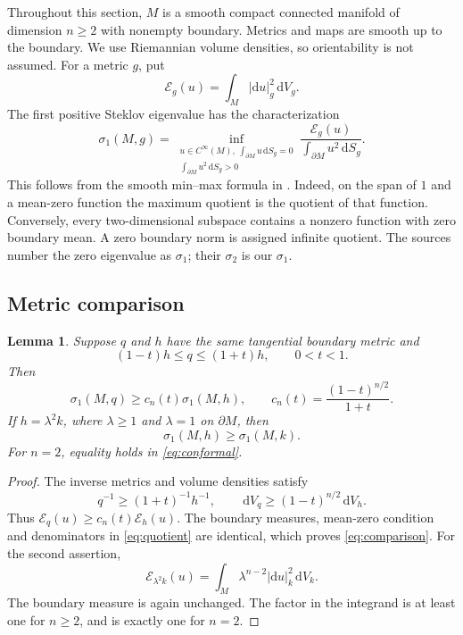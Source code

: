 \documentclass[11pt]{article}
\newtheorem{lemma}[lemma]{Lemma}
\theoremstyle{remark}
\newcommand{\dd}{\,\mathrm d}
\newcommand{\E}{\mathcal E}
\begin{document}
Throughout this section, $M$ is a smooth compact connected manifold of
dimension $n\geq2$ with nonempty boundary. Metrics and maps are smooth up to
the boundary. We use Riemannian volume densities, so orientability is not
assumed. For a metric $g$, put
\[
 \E_g(u)=\int_M |\mathrm du|_g^2\dd V_g.
\]
The first positive Steklov eigenvalue has the characterization
\begin{equation}\label{eq:quotient}
 \sigma_1(M,g)=
 \inf_{\substack{u\in C^\infty(M),\ \int_{\partial M}u\dd S_g=0\\
                         \int_{\partial M}u^2\dd S_g>0}}
 \frac{\E_g(u)}{\int_{\partial M}u^2\dd S_g}.
\end{equation}
This follows from the smooth min--max formula in
\cite[Section~2, equation~(2)]{CEG}. Indeed, on the span of $1$ and a
mean-zero function the maximum quotient is the quotient of that function.
Conversely, every two-dimensional subspace contains a nonzero function
with zero boundary mean. A zero boundary norm is assigned infinite
quotient. The sources \cite{CEG,CGR} number the zero eigenvalue as
$\sigma_1$; their $\sigma_2$ is our $\sigma_1$.

\subsection{Metric comparison}

\begin{lemma}\label{lem:comparison}
Suppose $q$ and $h$ have the same tangential boundary metric and
\[
 (1-t)h\leq q\leq(1+t)h,\qquad 0<t<1.
\]
Then
\begin{equation}\label{eq:comparison}
 \sigma_1(M,q)\geq c_n(t)\sigma_1(M,h),
 \qquad c_n(t)=\frac{(1-t)^{n/2}}{1+t}.
\end{equation}
If $h=\lambda^2k$, where $\lambda\geq1$ and
$\lambda=1$ on $\partial M$, then
\begin{equation}\label{eq:conformal}
 \sigma_1(M,h)\geq\sigma_1(M,k).
\end{equation}
For $n=2$, equality holds in \eqref{eq:conformal}.
\end{lemma}

\begin{proof}
The inverse metrics and volume densities satisfy
\[
 q^{-1}\geq(1+t)^{-1}h^{-1},\qquad
 \dd V_q\geq(1-t)^{n/2}\dd V_h.
\]
Thus $\E_q(u)\geq c_n(t)\E_h(u)$. The boundary measures,
mean-zero condition and denominators in \eqref{eq:quotient} are identical,
which proves \eqref{eq:comparison}. For the second assertion,
\[
 \E_{\lambda^2 k}(u)
   =\int_M\lambda^{n-2}|\mathrm du|_k^2\dd V_k.
\]
The boundary measure is again unchanged. The factor in the integrand is
at least one for $n\geq2$, and is exactly one for $n=2$.
\end{proof}
\end{document}
